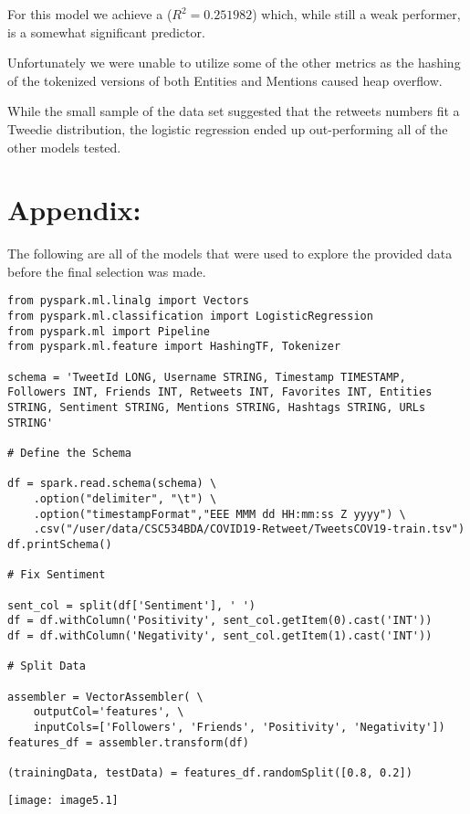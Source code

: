 \documentclass[]{article}
\begin{document}
For this model we achieve a
($R^2 = 0.251982$)
which, while still a weak performer, 
is a somewhat significant predictor. 

Unfortunately we were unable to utilize some of the other metrics as the hashing of the tokenized versions of both Entities and Mentions caused heap overflow.

While the small sample of the data set suggested that the retweets numbers fit a Tweedie distribution, the logistic regression ended up out-performing all of the other models tested.

\clearpage

\section*{Appendix:}
The following are all of the models that were used to explore the provided data before the final selection was made.

\begin{verbatim}
from pyspark.ml.linalg import Vectors
from pyspark.ml.classification import LogisticRegression
from pyspark.ml import Pipeline
from pyspark.ml.feature import HashingTF, Tokenizer

schema = 'TweetId LONG, Username STRING, Timestamp TIMESTAMP, Followers INT, Friends INT, Retweets INT, Favorites INT, Entities STRING, Sentiment STRING, Mentions STRING, Hashtags STRING, URLs STRING'

# Define the Schema 

df = spark.read.schema(schema) \
	.option("delimiter", "\t") \
	.option("timestampFormat","EEE MMM dd HH:mm:ss Z yyyy") \
	.csv("/user/data/CSC534BDA/COVID19-Retweet/TweetsCOV19-train.tsv")
df.printSchema()

# Fix Sentiment

sent_col = split(df['Sentiment'], ' ')
df = df.withColumn('Positivity', sent_col.getItem(0).cast('INT'))
df = df.withColumn('Negativity', sent_col.getItem(1).cast('INT'))

# Split Data

assembler = VectorAssembler( \
	outputCol='features', \
	inputCols=['Followers', 'Friends', 'Positivity', 'Negativity'])
features_df = assembler.transform(df)

(trainingData, testData) = features_df.randomSplit([0.8, 0.2])
\end{verbatim}
\texttt{[image: image5.1]} %
\end{document}
